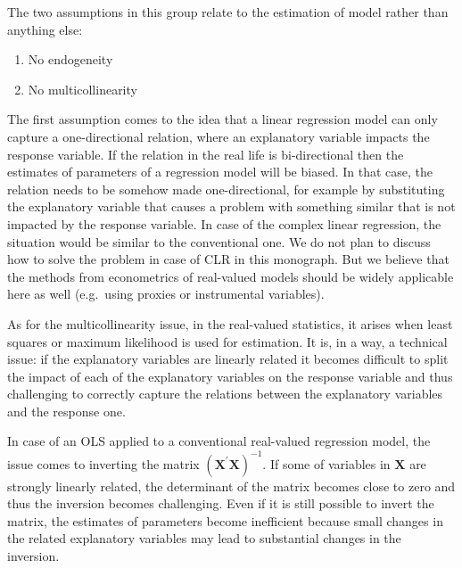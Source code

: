 \documentclass[
]{book}
\providecommand{\tightlist}{%
  \setlength{\itemsep}{0pt}\setlength{\parskip}{0pt}}
\begin{document}
The two assumptions in this group relate to the estimation of model rather than anything else:

\begin{enumerate}
\def\labelenumi{\arabic{enumi}.}
\tightlist
\item
  No endogeneity
\item
  No multicollinearity
\end{enumerate}

The first assumption comes to the idea that a linear regression model can only capture a one-directional relation, where an explanatory variable impacts the response variable. If the relation in the real life is bi-directional then the estimates of parameters of a regression model will be biased. In that case, the relation needs to be somehow made one-directional, for example by substituting the explanatory variable that causes a problem with something similar that is not impacted by the response variable. In case of the complex linear regression, the situation would be similar to the conventional one. We do not plan to discuss how to solve the problem in case of CLR in this monograph. But we believe that the methods from econometrics of real-valued models should be widely applicable here as well (e.g.~using proxies or instrumental variables).

As for the multicollinearity issue, in the real-valued statistics, it arises when least squares or maximum likelihood is used for estimation. It is, in a way, a technical issue: if the explanatory variables are linearly related it becomes difficult to split the impact of each of the explanatory variables on the response variable and thus challenging to correctly capture the relations between the explanatory variables and the response one.

In case of an OLS applied to a conventional real-valued regression model, the issue comes to inverting the matrix \(\left( {\mathbf{X}}^\prime {\mathbf{X}} \right)^{-1}\). If some of variables in \(\mathbf{X}\) are strongly linearly related, the determinant of the matrix becomes close to zero and thus the inversion becomes challenging. Even if it is still possible to invert the matrix, the estimates of parameters become inefficient because small changes in the related explanatory variables may lead to substantial changes in the inversion.
\end{document}
